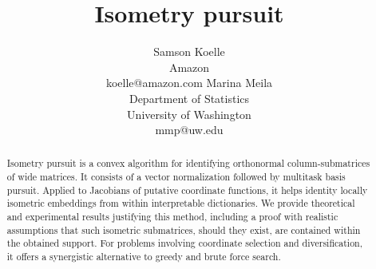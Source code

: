 \documentclass{article}
\title{Isometry pursuit}
\author{%
  Samson Koelle \\
  Amazon  \\
  koelle@amazon.com
  \And
  Marina Meila \\
  Department of Statistics\\
  University of Washington \\
  mmp@uw.edu
}
\begin{document}
\maketitle

\begin{abstract}
Isometry pursuit is a convex algorithm for identifying orthonormal column-submatrices of wide matrices.
It consists of a vector normalization followed by multitask basis pursuit.
Applied to Jacobians of putative coordinate functions, it helps identity locally isometric embeddings from within interpretable dictionaries.
We provide theoretical and experimental results justifying this method, including a proof with realistic assumptions that such isometric submatrices, should they exist, are contained within the obtained support.
For problems involving coordinate selection and diversification, it offers a synergistic alternative to greedy and brute force search.
\end{abstract}








\newpage



\newpage


\end{document}
